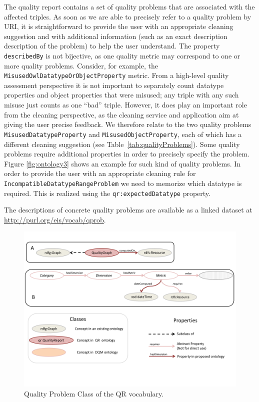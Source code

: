 The quality report contains a set of quality problems that are associated with the affected triples.
As soon as we are able to precisely refer to a quality problem by URI, it is straightforward to provide the user with an appropriate cleaning suggestion and with additional information (such as an exact description description of the problem) to help the user understand. 
The property \texttt{describedBy} is not bijective, as one quality metric may correspond to one or more quality problems. 
Consider, for example, the \texttt{MisusedOwlDatatypeOrObjectProperty} metric.
From a high-level quality assessment perspective it is not important to separately count datatype properties and object properties that were misused; any triple with any such misuse just counts as one ``bad'' triple.
However, it does play an important role from the cleaning  perspective, as the cleaning service and application aim at giving the user precise feedback.
We therefore relate to the two quality problems \texttt{MisusedDatatypeProperty} and \texttt{MisusedObjectProperty}, each of which has a different cleaning suggestion (see Table~\ref{tab:qualityProblems}). 
Some quality problems require additional properties in order to precisely specify the problem.
Figure \ref{fig:ontology3} shows an example for such kind of quality problems. 
In order to provide the user with an appropriate cleaning rule for \texttt{IncompatibleDatatypeRangeProblem} we need to memorize which datatype is required.  This is realized using the \texttt{qr:expectedDatatype} property.

The descriptions of concrete quality problems are available as a linked dataset at \url{http://purl.org/eis/vocab/qprob}.

\begin{figure}[ht!]
\centering
\includegraphics[page=3,trim=0.2cm 8.5cm 1.0cm 8.0cm,clip,width=\textwidth]{figures/cleaning.pdf}
\caption{Quality Problem Class of the QR vocabulary.}
\label{fig:ontology2}
\end{figure}


